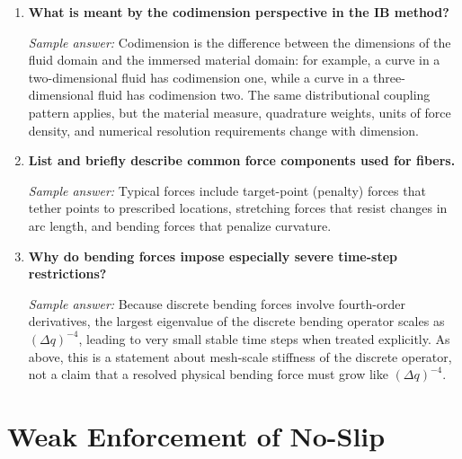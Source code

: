 \documentclass[11pt]{article}
\begin{document}
\begin{enumerate}[label=\arabic*., resume]

\item \textbf{What is meant by the codimension perspective in the IB method?}

\textit{Sample answer:}  
Codimension is the difference between the dimensions of the fluid domain and the immersed material domain: for example, a curve in a two-dimensional fluid has codimension one, while a curve in a three-dimensional fluid has codimension two. The same distributional coupling pattern applies, but the material measure, quadrature weights, units of force density, and numerical resolution requirements change with dimension.

\item \textbf{List and briefly describe common force components used for fibers.}

\textit{Sample answer:}  
Typical forces include target-point (penalty) forces that tether points to prescribed locations, stretching forces that resist changes in arc length, and bending forces that penalize curvature.

\item \textbf{Why do bending forces impose especially severe time-step restrictions?}

\textit{Sample answer:}  
Because discrete bending forces involve fourth-order derivatives, the largest eigenvalue of the discrete bending operator scales as $(\Delta q)^{-4}$, leading to very small stable time steps when treated explicitly. As above, this is a statement about mesh-scale stiffness of the discrete operator, not a claim that a resolved physical bending force must grow like $(\Delta q)^{-4}$.

\end{enumerate}

\section*{Weak Enforcement of No-Slip}
\end{document}
